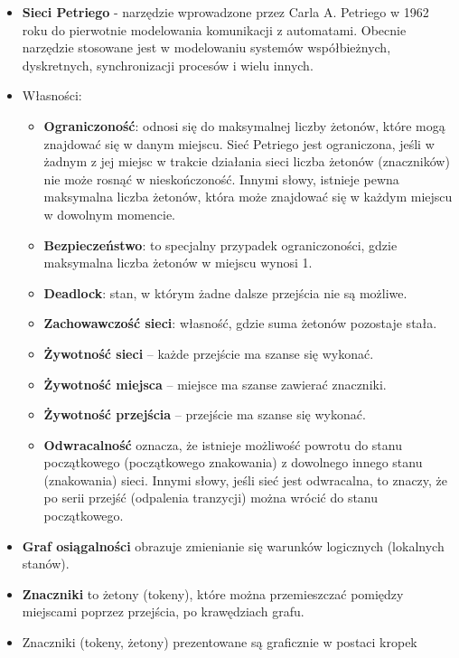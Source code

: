 \documentclass[11pt]{article}
\providecommand{\tightlist}{%
      \setlength{\itemsep}{0pt}\setlength{\parskip}{0pt}}
\begin{document}
\begin{itemize}
\item
  \textbf{Sieci Petriego} - narzędzie wprowadzone przez Carla A.
  Petriego w 1962 roku do pierwotnie modelowania komunikacji z
  automatami. Obecnie narzędzie stosowane jest w modelowaniu systemów
  współbieżnych, dyskretnych, synchronizacji procesów i wielu innych.
\item
  Własności:

  \begin{itemize}
  \tightlist
  \item
    \textbf{Ograniczoność}: odnosi się do maksymalnej liczby żetonów,
    które mogą znajdować się w danym miejscu. Sieć Petriego jest
    ograniczona, jeśli w żadnym z jej miejsc w trakcie działania sieci
    liczba żetonów (znaczników) nie może rosnąć w nieskończoność. Innymi
    słowy, istnieje pewna maksymalna liczba żetonów, która może
    znajdować się w każdym miejscu w dowolnym momencie.
  \item
    \textbf{Bezpieczeństwo}: to specjalny przypadek ograniczoności,
    gdzie maksymalna liczba żetonów w miejscu wynosi 1.
  \item
    \textbf{Deadlock}: stan, w którym żadne dalsze przejścia nie są
    możliwe.
  \item
    \textbf{Zachowawczość sieci}: własność, gdzie suma żetonów pozostaje
    stała.
  \item
    \textbf{Żywotność sieci} -- każde przejście ma szanse się wykonać.
  \item
    \textbf{Żywotność miejsca} -- miejsce ma szanse zawierać znaczniki.
  \item
    \textbf{Żywotność przejścia} -- przejście ma szanse się wykonać.
  \item
    \textbf{Odwracalność} oznacza, że istnieje możliwość powrotu do
    stanu początkowego (początkowego znakowania) z dowolnego innego
    stanu (znakowania) sieci. Innymi słowy, jeśli sieć jest odwracalna,
    to znaczy, że po serii przejść (odpalenia tranzycji) można wrócić do
    stanu początkowego.
  \end{itemize}
\item
  \textbf{Graf osiągalności} obrazuje zmienianie się warunków logicznych
  (lokalnych stanów).
\item
  \textbf{Znaczniki} to żetony (tokeny), które można przemieszczać
  pomiędzy miejscami poprzez przejścia, po krawędziach grafu.
\item
  Znaczniki (tokeny, żetony) prezentowane są graficznie w postaci kropek

\end{itemize}
\end{document}
